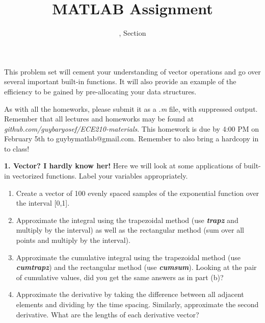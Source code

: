 \documentclass[11pt]{article}
\title{MATLAB Assignment \Homework}
\author{\Session, Section \Section}
\date{}
\makeatletter
\def\MyEmail{guybymatlab@gmail.com}
\def\DateOfSubmission{February 5th }
\newenvironment{qparts}{\begin{enumerate}[{(}a{)}]}{\end{enumerate}}
\makeatother
\begin{document}
\maketitle
This problem set will cement your understanding of vector operations and
go over several important built-in functions.
It will also provide an example of the efficiency to be gained by pre-allocating
your data structures.

As with all the homeworks, please submit it as a \textit{.m} file, 
with suppressed output.
Remember that all lectures and homeworks may be found at 
\textit{github.com/guybaryosef/ECE210-materials}.
This homework is due by 4:00 PM on \DateOfSubmission to \MyEmail.
Remember to also bring a hardcopy in to class! 

\noindent
\newline
\textbf{1. Vector? I hardly know her!}
Here we will look at some applications of built-in vectorized functions.
Label your variables appropriately.
\begin{qparts}
    \item Create a vector of 100 evenly spaced samples of
    the exponential function over the interval [0,1].

    \item Approximate the integral using the trapezoidal method
    (use \textbf{\textit{trapz}} and multiply by the interval)
    as well as the rectangular method (sum over all points and multiply by the interval).

    \item Approximate the cumulative integral using the trapezoidal method
    (use \textbf{\textit{cumtrapz}}) and the rectangular method
    (use \textbf{\textit{cumsum}}).
    Looking at the pair of cumulative values,
    did you get the same answers as in part (b)?

    \item Approximate the derivative by taking the difference between
    all adjacent elements and dividing by the time spacing.
    Similarly, approximate the second derivative.
    What are the lengths of each derivative vector?

\end{qparts}
\end{document}

